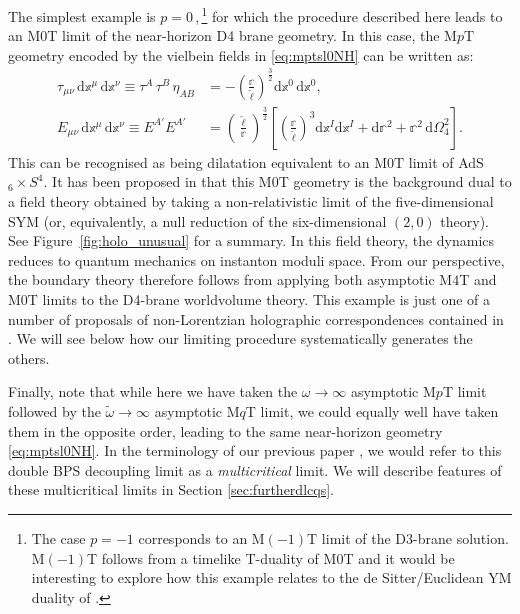 \documentclass[11pt]{article}
\renewcommand{\tilde}[1]{\widetilde{#1}}
\renewcommand{\emph}[1]{\textit{#1}}
\newcommand{\dd}{\mathrm{d}}
\newcommand{\lbb}{\tilde{\ell}}
\begin{document}
The simplest example is  $p=0$\,,\,\footnote{The case $p=-1$ corresponds to an M$(-1)$T limit of the D3-brane solution. M$(-1)$T follows from a timelike T-duality of M0T \cite{Blair:2023noj,Gomis:2023eav} and it would be interesting to explore how this example relates to the de Sitter/Euclidean YM duality of \cite{Hull:1998vg}.} for which the procedure described here leads to an M0T limit of the near-horizon D4 brane geometry.
In this case, the M$p$T geometry encoded by the vielbein fields in \eqref{eq:mptsl0NH} can be written as:
%
\begin{subequations}
\begin{align}
\tau_{\mu\nu} \, \dd \mathbb{x}^\mu \, \dd \mathbb{x}^\nu \equiv \tau^A \, \tau^B \, \eta_{AB} 
& = - \left( \frac{\mathbb{r}}{\lbb} \right)^{\!\!\frac{3}{2}} \dd \mathbb{x}^0 \, \dd \mathbb{x}^0,\\[4pt]
E_{\mu\nu} \, \dd \mathbb{x}^\mu \, \dd \mathbb{x}^\nu \equiv
E^{A'} E^{A'} & = 
\left( \frac{\lbb}{\mathbb{r}} \right)^{\!\!\frac{3}{2}} 
\left[
\left( \frac{\mathbb{r}}{\lbb} \right)^{\!\!3} \dd \mathbb{x}^I \dd \mathbb{x}^I 
+ \dd \mathbb{r}^2 + \mathbb{r}^2 \, \dd \Omega_4^2
\right].
\end{align}
\end{subequations}
%
This can be recognised as being dilatation equivalent to an M0T limit of AdS${}_6 \times S^4$.
It has been proposed in \cite{Lambert:2024yjk} 
that this M0T geometry is the background dual to a field theory obtained by taking a non-relativistic limit of the five-dimensional SYM (or, equivalently, a null reduction of the six-dimensional $(2,0)$ theory). See Figure~\ref{fig:holo_unusual} for a summary. In this field theory, the dynamics reduces to quantum mechanics on instanton moduli space. From our perspective, the boundary theory therefore follows from applying both asymptotic M$4$T and M0T limits to the D4-brane worldvolume theory. 
This example is just one of a number of proposals of non-Lorentzian holographic correspondences contained in \cite{Lambert:2024yjk}. 
We will see below how our limiting procedure systematically generates the others.

Finally, note that while here we have taken the $\omega \rightarrow \infty$ asymptotic M$p$T limit followed by the $\tilde \omega \rightarrow \infty$ asymptotic M$q$T limit, we could equally well have taken them in the opposite order, leading to the same near-horizon geometry \eqref{eq:mptsl0NH}.
In the terminology of our previous paper \cite{Blair:2023noj}, we would refer to this double BPS decoupling limit as a \emph{multicritical} limit. 
We will describe features of these multicritical limits in Section \ref{sec:furtherdlcqs}.
\end{document}
